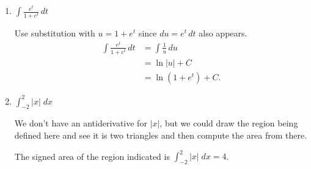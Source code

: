 \documentclass[main]{subfiles}
\begin{document}
\begin{enumerate}
\begin{enumerate}
\begin{solution}
        \begin{align*}
            \int xe^{x^2}\, dx &= \frac{1}{2} \int e^u\, du \\
            &= \frac{1}{2}e^u +C \\
            &= \frac{1}{2}e^{x^2} + C.
        \end{align*}
    \end{solution}

    \item
    \begin{problem}[\vfill\newpage]
        $\displaystyle \int \frac{e^t}{1+e^t}\, dt$
    \end{problem}

    \begin{solution}
        Use substitution with $u=1+e^t$ since $du = e^t\,dt$ also appears.
        \begin{align*}
            \int \frac{e^t}{1+e^t}\, dt &= \int \frac{1}{u}\,du\\
            &= \ln|u| + C \\
            &= \ln(1+e^t) +C.
        \end{align*}
    \end{solution}

    \item 
    \begin{problem}[\vfill]
        $\displaystyle\int_{-2}^{2} |x|\;dx$
    \end{problem}

    \begin{solution}
        We don't have an antiderivative for $|x|$, but we could draw the region being defined here and see it is two triangles and then compute the area from there.

        The signed area of the region indicated is 
        $\displaystyle\int_{-2}^{2} |x|\;dx = 4$.
        \begin{center}
            \end{center}

    \end{solution}


\end{enumerate}
\end{enumerate}
\end{document}
